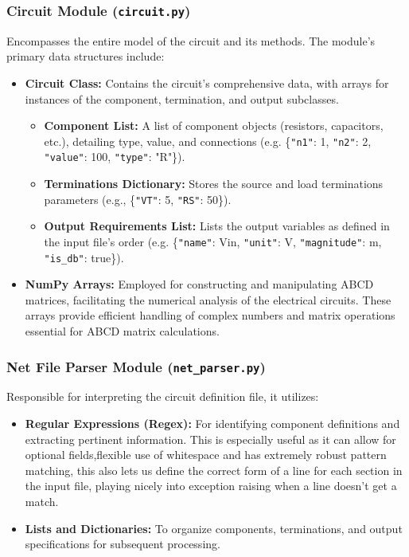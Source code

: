 \documentclass[conference]{IEEEtran}
\begin{document}
\subsubsection*{\textbf{Circuit Module} (\texttt{circuit.py})}
Encompasses the entire model of the circuit and its methods. The module's primary data structures include:
\begin{itemize}
    \item \textbf{Circuit Class:} Contains the circuit's comprehensive data, with arrays for instances of the component, termination, and output subclasses.
    \begin{itemize}
        \item \textbf{Component List:} A list of component objects (resistors, capacitors, etc.), detailing type, value, and connections (e.g. \{\texttt{"n1"}: 1, \texttt{"n2"}: 2, \texttt{"value"}: 100, \texttt{"type"}: "R"\}).
        \item \textbf{Terminations Dictionary:} Stores the source and load terminations parameters (e.g., \{\texttt{"VT"}: 5, \texttt{"RS"}: 50\}).
        \item \textbf{Output Requirements List:} Lists the output variables as defined in the input file's order (e.g. \{\texttt{"name"}: Vin, \texttt{"unit"}: V, \texttt{"magnitude"}: m, \texttt{"is\_db"}: true\}).
    \end{itemize}
    \item \textbf{NumPy Arrays:} Employed for constructing and manipulating ABCD matrices, facilitating the numerical analysis of the electrical circuits. These arrays provide efficient handling of complex numbers and matrix operations essential for ABCD matrix calculations.
\end{itemize}

\subsubsection*{\textbf{Net File Parser Module} (\texttt{net\_parser.py})}
Responsible for interpreting the circuit definition file, it utilizes:
\begin{itemize}
    \item \textbf{Regular Expressions (Regex):} For identifying component definitions and extracting pertinent information. 
    This is especially useful as it can allow for optional fields,flexible use of whitespace and has extremely robust pattern matching,
    this also lets us define the correct form of a line for each section in the input file, playing nicely into exception raising when a line doesn't get a match.
    \item \textbf{Lists and Dictionaries:} To organize components, terminations, and output specifications for subsequent processing.
\end{itemize}
\end{document}
